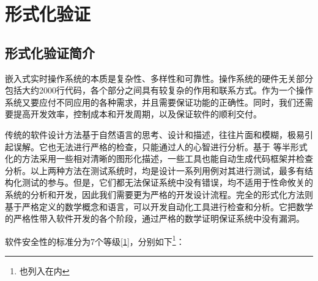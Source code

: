 \chapter{形式化验证}\label{ch:formal-verification}

\section{形式化验证简介}\label{sec:introduction-to-formal-verification}

嵌入式实时操作系统的本质是复杂性、多样性和可靠性。操作系统的硬件无关部分包括大约2000行代码，各个部分之间具有较复杂的作用和联系方式。作为一个操作系统又要应付不同应用的各种需求，并且需要保证功能的正确性。同时，我们还需要提高开发效率，控制成本和开发周期，以及保证软件的顺利交付。

传统的软件设计方法基于自然语言的思考、设计和描述，往往片面和模糊，极易引起误解。它也无法进行严格的检查，只能通过人的心智进行分析。基于
等半形式化的方法采用一些相对清晰的图形化描述，一些工具也能自动生成代码框架并检查分析。以上两种方法在测试系统时，均是设计一系列用例对其进行测试，最多有结构化测试的参与。但是，它们都无法保证系统中没有错误，均不适用于性命攸关的系统的分析和开发，因此我们需要更为严格的开发设计流程。完全的形式化方法则基于严格定义的数学概念和语言，可以开发自动化工具进行检查和分析。它把数学的严格性带入软件开发的各个阶段，通过严格的数学证明保证系统中没有漏洞。

软件安全性的标准分为7个等级\hyperref[sec:chapter-bibliography-8]{{[}1{]}}，分别如下\footnote{也列入在内}：

\label{tab:eal-levels-and-their-descriptions}

